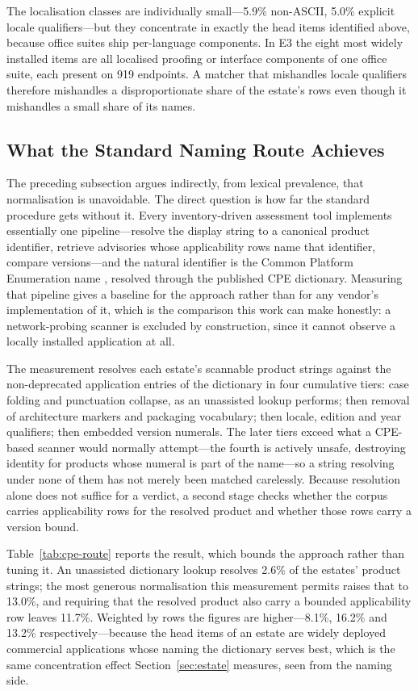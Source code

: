 \documentclass[fleqn,10pt,lineno]{wlpeerj}
\begin{document}
The localisation classes are individually small---5.9\% non-ASCII, 5.0\% explicit locale qualifiers---but they concentrate in exactly the head items identified above, because office suites ship per-language components. In E3 the eight most widely installed items are all localised proofing or interface components of one office suite, each present on 919 endpoints. A matcher that mishandles locale qualifiers therefore mishandles a disproportionate share of the estate's rows even though it mishandles a small share of its names.

\subsection{What the Standard Naming Route Achieves}
\label{sec:cpe-route}
The preceding subsection argues indirectly, from lexical prevalence, that normalisation is unavoidable. The direct question is how far the standard procedure gets without it. Every inventory-driven assessment tool implements essentially one pipeline---resolve the display string to a canonical product identifier, retrieve advisories whose applicability rows name that identifier, compare versions---and the natural identifier is the Common Platform Enumeration name \cite{cpe}, resolved through the published CPE dictionary. Measuring that pipeline gives a baseline for the approach rather than for any vendor's implementation of it, which is the comparison this work can make honestly: a network-probing scanner is excluded by construction, since it cannot observe a locally installed application at all.

The measurement resolves each estate's scannable product strings against the non-deprecated application entries of the dictionary in four cumulative tiers: case folding and punctuation collapse, as an unassisted lookup performs; then removal of architecture markers and packaging vocabulary; then locale, edition and year qualifiers; then embedded version numerals. The later tiers exceed what a CPE-based scanner would normally attempt---the fourth is actively unsafe, destroying identity for products whose numeral is part of the name---so a string resolving under none of them has not merely been matched carelessly. Because resolution alone does not suffice for a verdict, a second stage checks whether the corpus carries applicability rows for the resolved product and whether those rows carry a version bound.



Table~\ref{tab:cpe-route} reports the result, which bounds the approach rather than tuning it. An unassisted dictionary lookup resolves 2.6\% of the estates' product strings; the most generous normalisation this measurement permits raises that to 13.0\%, and requiring that the resolved product also carry a bounded applicability row leaves 11.7\%. Weighted by rows the figures are higher---8.1\%, 16.2\% and 13.2\% respectively---because the head items of an estate are widely deployed commercial applications whose naming the dictionary serves best, which is the same concentration effect Section~\ref{sec:estate} measures, seen from the naming side.
\end{document}
